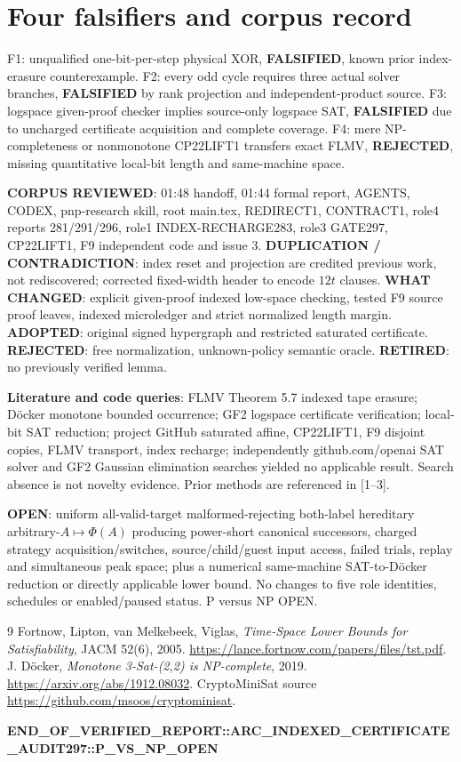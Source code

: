 \documentclass[10pt]{article}
\begin{document}
\section{Four falsifiers and corpus record}
F1: unqualified one-bit-per-step physical XOR, \textbf{FALSIFIED}, known prior index-erasure counterexample. F2: every odd cycle requires three actual solver branches, \textbf{FALSIFIED} by rank projection and independent-product source. F3: logspace given-proof checker implies source-only logspace SAT, \textbf{FALSIFIED} due to uncharged certificate acquisition and complete coverage. F4: mere NP-completeness or nonmonotone CP22LIFT1 transfers exact FLMV, \textbf{REJECTED}, missing quantitative local-bit length and same-machine space.

\noindent\textbf{CORPUS REVIEWED}: 01:48 handoff, 01:44 formal report, AGENTS, CODEX, pnp-research skill, root main.tex, REDIRECT1, CONTRACT1, role4 reports 281/291/296, role1 INDEX-RECHARGE283, role3 GATE297, CP22LIFT1, F9 independent code and issue 3. \textbf{DUPLICATION / CONTRADICTION}: index reset and projection are credited previous work, not rediscovered; corrected fixed-width header to encode $12t$ clauses. \textbf{WHAT CHANGED}: explicit given-proof indexed low-space checking, tested F9 source proof leaves, indexed microledger and strict normalized length margin. \textbf{ADOPTED}: original signed hypergraph and restricted saturated certificate. \textbf{REJECTED}: free normalization, unknown-policy semantic oracle. \textbf{RETIRED}: no previously verified lemma.

\noindent\textbf{Literature and code queries}: FLMV Theorem 5.7 indexed tape erasure; D\"ocker monotone bounded occurrence; GF2 logspace certificate verification; local-bit SAT reduction; project GitHub saturated affine, CP22LIFT1, F9 disjoint copies, FLMV transport, index recharge; independently github.com/openai SAT solver and GF2 Gaussian elimination searches yielded no applicable result. Search absence is not novelty evidence. Prior methods are referenced in [1--3].

\noindent\textbf{OPEN}: uniform all-valid-target malformed-rejecting both-label hereditary arbitrary-$A\mapsto\Phi(A)$ producing power-short canonical successors, charged strategy acquisition/switches, source/child/guest input access, failed trials, replay and simultaneous peak space; plus a numerical same-machine SAT-to-D\"ocker reduction or directly applicable lower bound. No changes to five role identities, schedules or enabled/paused status. P versus NP OPEN.
\begin{thebibliography}{9}
 Fortnow, Lipton, van Melkebeek, Viglas, \emph{Time-Space Lower Bounds for Satisfiability}, JACM 52(6), 2005. \url{https://lance.fortnow.com/papers/files/tst.pdf}.
 J. D\"ocker, \emph{Monotone 3-Sat-(2,2) is NP-complete}, 2019. \url{https://arxiv.org/abs/1912.08032}.
 CryptoMiniSat source \url{https://github.com/msoos/cryptominisat}.
\end{thebibliography}
\noindent\textbf{END\_OF\_VERIFIED\_REPORT::ARC\_INDEXED\_CERTIFICATE\_AUDIT297::P\_VS\_NP\_OPEN}
\end{document}
